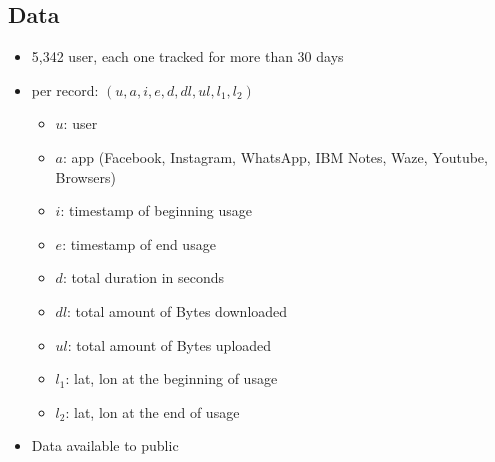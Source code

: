 \subsection{Data}
    \begin{itemize}
        \item 5,342 user, each one tracked for more than 30 days
        \item per record: $(u, a, i, e, d, dl, ul, l_1, l_2)$
            \begin{itemize}
                \item $u$: user 
                \item $a$: app (Facebook, Instagram, WhatsApp, IBM Notes, Waze, Youtube, Browsers)
                \item $i$: timestamp of beginning usage 
                \item $e$: timestamp of end usage 
                \item $d$: total duration in seconds 
                \item $dl$: total amount of Bytes downloaded 
                \item $ul$: total amount of Bytes uploaded 
                \item $l_1$: lat, lon at the beginning of usage 
                \item $l_2$: lat, lon at the end of usage 
            \end{itemize}
        \item Data available to public
    \end{itemize}

